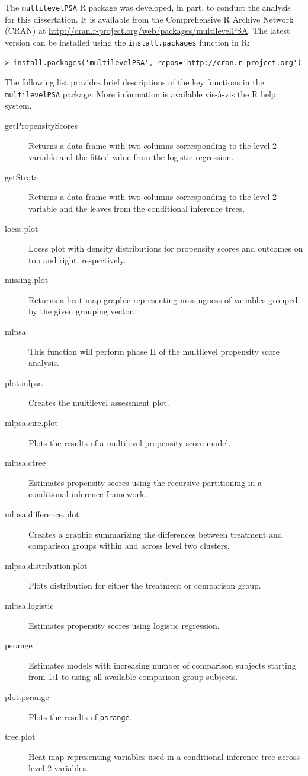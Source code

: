 The \texttt{multilevelPSA} R package was developed, in part, to conduct the analysis for this dissertation. It is available from the Comprehensive R Archive Network (CRAN) at \url{http://cran.r-project.org/web/packages/multilevelPSA}. The latest version can be installed using the \texttt{install.packages} function in R:

\begin{verbatim}
> install.packages('multilevelPSA', repos='http://cran.r-project.org')
\end{verbatim}

The following list provides brief descriptions of the key functions in the \texttt{multilevelPSA} package. More information is available vis-\`a-vis the R help system.

\renewcommand{\descriptionlabel}[1]{\hspace{\labelsep}\textbf{\texttt{#1}}}
\begin{description}
\item[getPropensityScores] Returns a data frame with two columns corresponding to the level 2 variable and the fitted value from the logistic regression.
\item[getStrata] Returns a data frame with two columns corresponding to the level 2 variable and the leaves from the conditional inference trees.
\item[loess.plot] Loess plot with density distributions for propensity scores and outcomes on top and right, respectively.
\item[missing.plot] Returns a heat map graphic representing missingness of variables grouped by the given grouping vector.
\item[mlpsa] This function will perform phase II of the multilevel propensity score analysis.
\item[plot.mlpsa] Creates the multilevel assessment plot.
\item[mlpsa.circ.plot] Plots the results of a multilevel propensity score model.
\item[mlpsa.ctree] Estimates propensity scores using the recursive partitioning in a conditional inference framework.
\item[mlpsa.difference.plot] Creates a graphic summarizing the differences between treatment and comparison groups within and across level two clusters.
\item[mlpsa.distribution.plot] Plots distribution for either the treatment or comparison group.
\item[mlpsa.logistic] Estimates propensity scores using logistic regression.
\item[psrange] Estimates models with increasing number of comparison subjects starting from 1:1 to using all available comparison group subjects.
\item[plot.psrange] Plots the results of \texttt{psrange}.
\item[tree.plot] Heat map representing variables used in a conditional inference tree across level 2 variables.
\end{description}

